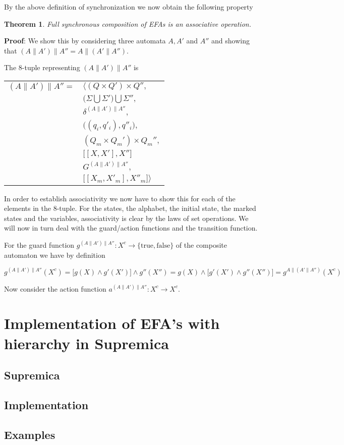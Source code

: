 \documentclass{article}
\newtheorem{theorem}{Theorem}
\begin{document}
\noindent By the above definition of synchronization we now obtain
the following property

\begin{theorem}
   Full synchronous composition of EFAs is an associative
   operation.
\end{theorem}

\noindent \textbf{Proof}: We show this by considering three
automata $A, A'$ and $A''$ and showing that $(A\|A')\|A'' =
A\|(A'\|A'')$.

The 8-tuple representing $(A\|A')\|A''$ is

\begin{center}
\begin{tabular}{ll}
  $(A\|A')\|A'' =$ & $\Big \langle (Q \times Q') \times Q'',$\\
  & $ \big(\Sigma \bigcup \Sigma' \big) \bigcup \Sigma'',$\\
  & $\delta^{(A\|A')\|A''},$\\
  & $\big((q_i, q'_i) , q''_i\big),$\\
  & $(Q_m \times Q_m') \times Q_m'',$\\
  & $\big[[X, X'], X'']$\\
  & $G^{(A\|A')\|A''},$\\
  & $\big[[X_m, X'_m], X''_m \big] \Big \rangle$
\end{tabular}
\end{center}

\noindent In order to establish associativity we now have to show
this for each of the elements in the 8-tuple. For the states, the
alphabet, the initial state, the marked states and the variables,
associativity is clear by the laws of set operations. We will now
in turn deal with the guard/action functions and the transition
function.

For the guard function $g^{(A\|A')\|A''} : X^c \rightarrow
\{\mathrm{true}, \mathrm{false}\}$ of the composite automaton we
have by definition

\begin{equation}
  g^{(A\|A')\|A''}(X^c) = \big[g(X) \wedge g'(X') \big] \wedge g''(X'') = g(X) \wedge \big[g'(X') \wedge g''(X'')] = g^{A\|(A'\|A'')}(X^c)
\end{equation}

\noindent Now consider the action function $a^{(A\|A')\|A''} : X^c
\rightarrow X^c$.

\section{Implementation of EFA's with hierarchy in Supremica}

\subsection{Supremica}

\subsection{Implementation}\label{Implementation}
\subsection{Examples}
\end{document}
